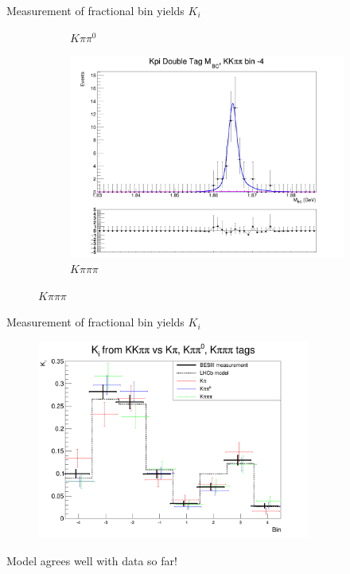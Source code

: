 \documentclass{beamer}
\begin{document}
\begin{frame}{Measurement of fractional bin yields $K_i$}
\begin{figure}
\begin{subfigure}{0.35\textwidth}
      \caption{$K\pi\pi^0$}
    \end{subfigure}%
    \begin{subfigure}{0.35\textwidth}
      \includegraphics[width = 1.0\textwidth]{Plots/DoubleTagYield_DoubleTag_Flavour_KKpipi_vs_Kpi_SignalBinM4_TagBin0.png}
      \caption{$K\pi\pi\pi$}
    \end{subfigure}
  \end{figure}
\end{frame}

\begin{frame}{Measurement of fractional bin yields $K_i$}
  \begin{figure}
    \includegraphics[width = 0.80\textwidth]{Plots/Ki_Measured_vs_Model.png}
  \end{figure}
  \vspace{-0.6cm}
  \begin{center}
    \Large Model agrees well with data so far!
  \end{center}
\end{frame}
\end{document}
